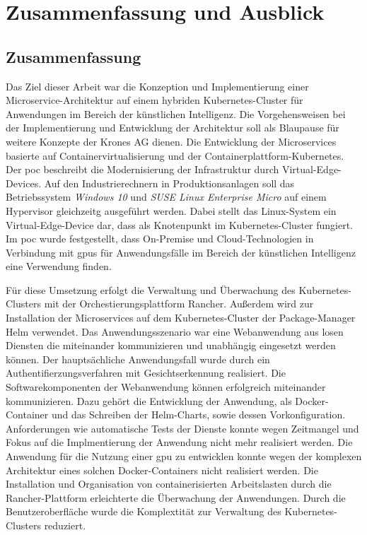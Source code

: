 \chapter{Zusammenfassung und Ausblick}
\section{Zusammenfassung}
Das Ziel dieser Arbeit war die Konzeption und Implementierung einer Microservice-Architektur auf einem hybriden Kubernetes-Cluster für Anwendungen im Bereich der künstlichen Intelligenz.
Die Vorgehensweisen bei der Implementierung und Entwicklung der Architektur soll als Blaupause für weitere Konzepte der Krones AG dienen.
Die Entwicklung der Microservices basierte auf Containervirtualisierung und der Containerplattform-Kubernetes.
Der \acs{poc} beschreibt die Modernisierung der Infrastruktur durch Virtual-Edge-Devices.
Auf den Industrierechnern in Produktionsanlagen soll das Betriebssystem \textit{Windows 10} und \textit{SUSE Linux Enterprise Micro} auf einem Hypervisor gleichzeitg ausgeführt werden.
Dabei stellt das Linux-System ein Virtual-Edge-Device dar, dass als Knotenpunkt im Kubernetes-Cluster fungiert.
Im \acs{poc} wurde festgestellt, dass On-Premise und Cloud-Technologien in Verbindung mit \ac{gpu}s für Anwendungsfälle im Bereich der künstlichen Intelligenz eine Verwendung finden.


Für diese Umsetzung erfolgt die Verwaltung und Überwachung des Kubernetes-Clusters mit der Orchestierungsplattform Rancher.
Außerdem wird zur Installation der Microservices auf dem Kubernetes-Cluster der Package-Manager Helm verwendet.
Das Anwendungsszenario war eine Webanwendung aus losen Diensten die miteinander kommunizieren und unabhängig eingesetzt werden können.
Der hauptsächliche Anwendungsfall wurde durch ein Authentifierzungsverfahren mit Gesichtserkennung realisiert.
Die Softwarekomponenten der Webanwendung können erfolgreich miteinander kommunizieren.
Dazu gehört die Entwicklung der Anwendung, als Docker-Container und das Schreiben der Helm-Charts, sowie dessen Vorkonfiguration.
Anforderungen wie automatische Tests der Dienste konnte wegen Zeitmangel und Fokus auf die Implmentierung der Anwendung nicht mehr realisiert werden.
Die Anwendung für die Nutzung einer \acs{gpu} zu entwicklen konnte wegen der komplexen Architektur eines solchen Docker-Containers nicht realisiert werden.
Die Installation und Organisation von containerisierten Arbeitslasten durch die Rancher-Plattform erleichterte die Überwachung der Anwendungen.
Durch die Benutzeroberfläche wurde die Komplextität zur Verwaltung des Kubernetes-Clusters reduziert.

